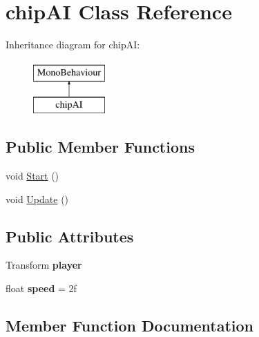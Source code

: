 \hypertarget{classchip_a_i}{}\section{chip\+AI Class Reference}
\label{classchip_a_i}
Inheritance diagram for chip\+AI\+:\begin{figure}[H]
\begin{center}
\leavevmode
\includegraphics[height=2.000000cm]{classchip_a_i}
\end{center}
\end{figure}
\subsection*{Public Member Functions}
\begin{DoxyCompactItemize}
\item 
void \mbox{\hyperlink{classchip_a_i_ac18952b5af76d83063b05dae2e3c44c0}{Start}} ()
\item 
void \mbox{\hyperlink{classchip_a_i_a32e9caf3833a989c9b596bc9aa3bf0e9}{Update}} ()
\end{DoxyCompactItemize}
\subsection*{Public Attributes}
\begin{DoxyCompactItemize}
\item 
\mbox{\label{classchip_a_i_a438b2bd6c24f4fa9af253b18a9910190}} 
Transform {\bfseries player}
\item 
\mbox{\label{classchip_a_i_a7cb408dbc8e59270c802f7bac547d7df}} 
float {\bfseries speed} = 2f
\end{DoxyCompactItemize}


\subsection{Member Function Documentation}
\mbox{\label{classchip_a_i_ac18952b5af76d83063b05dae2e3c44c0}} 
